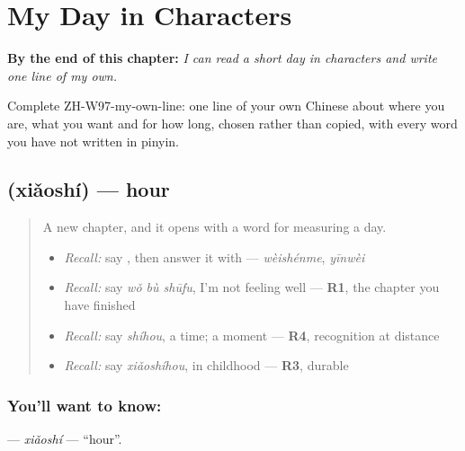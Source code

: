 
\chapter{My Day in Characters}
\label{ch:zh-my-day-in-characters}

\begin{chapteropening}
\textbf{By the end of this chapter:} \emph{I can read a short day in characters and write one line of my own.}

Complete ZH-W97-my-own-line: one line of your own Chinese about where you are, what you want and for how long, chosen rather than copied, with every word you have not written in pinyin.
\end{chapteropening}

\section[\texorpdfstring{\zh{小时} (xiǎoshí)}{小时 (xiǎoshí)}]{ (xiǎoshí) — hour}

\label{lesson:ZH-C97-xiaoshi}



\begin{quote}
A new chapter, and it opens with a word for measuring a day.

\begin{itemize}
\raggedright
  \item \emph{Recall:} say , then answer it with  — \emph{wèishénme}, \emph{yīnwèi}
  \item \emph{Recall:} say \emph{wǒ bù shūfu}, I'm not feeling well — \textbf{R1}, the chapter you have finished
  \item \emph{Recall:} say \emph{shíhou}, a time; a moment — \textbf{R4}, recognition at distance
  \item \emph{Recall:} say \emph{xiǎoshíhou}, in childhood — \textbf{R3}, durable
\end{itemize}
\end{quote}

\subsection*{You'll want to know: }
\textbf{} — \emph{xiǎoshí} — \textquotedblleft{}hour\textquotedblright{}.

